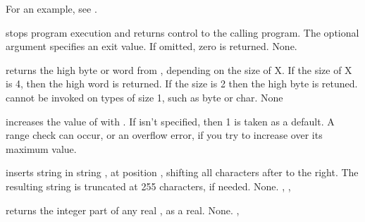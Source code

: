 \documentclass{report}
\begin{document}
For an example, see .

{ stops program execution and returns control to the calling
program. The optional argument  specifies an exit value. If
omitted, zero is returned.}
{None.}
{}



{ returns the high byte or word from , depending on the size
of X. If the size of X is 4, then the high word is returned. If the size is
2 then the high byte is retuned. 
 cannot be invoked on types of size 1, such as byte or char.}
{None}
{}



{ increases the value of  with .
If  isn't specified, then 1 is taken as a default.}
{A range check can occur, or an overflow error, if you try to increase 
over its maximum value.}
{}



{ inserts string  in string , at position
, shifting all characters after  to the right. The
resulting string is truncated at 255 characters, if needed.}
{None.}
{, , }



{ returns the integer part of any real , as a real.}
{None.}
{, }


\end{document}
